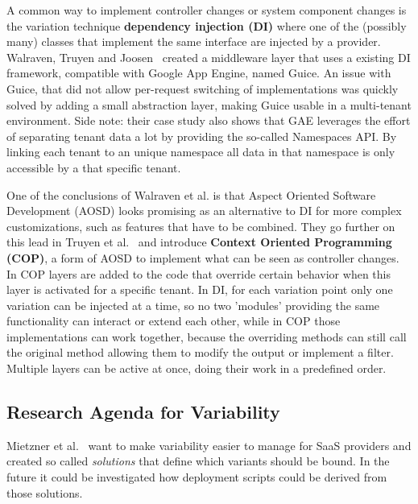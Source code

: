 A common way to implement controller changes or system component changes is the variation technique \textbf{dependency injection (DI)} where one of the (possibly many) classes that implement the same interface are injected by a provider. 
Walraven, Truyen and Joosen~\cite{walraven2011middleware} created a middleware layer that uses a existing DI framework, compatible with Google App Engine, named Guice. An issue with Guice, that did not allow per-request switching of implementations was quickly solved by adding a small abstraction layer, making Guice usable in a multi-tenant environment.
Side note: their case study also shows that GAE leverages the effort of separating tenant data a lot by providing the so-called Namespaces API. By linking each tenant to an unique namespace all data in that namespace is only accessible by a that specific tenant.

One of the conclusions of Walraven et al. is that Aspect Oriented Software Development (AOSD) looks promising as an alternative to DI for more complex customizations, such as features that have to be combined.
They go further on this lead in Truyen et al.~\cite{truyen2012context} and introduce \textbf{Context Oriented Programming (COP)}, a form of AOSD to implement what can be seen as controller changes. 
In COP layers are added to the code that override certain behavior when this layer is activated for a specific tenant. 
In DI, for each variation point only one variation can be injected at a time, so no two 'modules' providing the same functionality can interact or extend each other, while in COP those implementations can work together, because the overriding methods can still call the original method allowing them to modify the output or implement a filter. 
Multiple layers can be active at once, doing their work in a predefined order. 

\subsection{Research Agenda for Variability}

Mietzner et al.~\cite{mietzner2008defining} want to make variability easier to manage for SaaS providers and created so called \textit{solutions} that define which variants should be bound. In the future it could be investigated how deployment scripts could be derived from those solutions.

